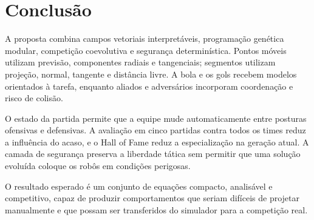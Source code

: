 \documentclass[12pt,a4paper]{article}
\begin{document}
\section{Conclus\~ao}

A proposta combina campos vetoriais interpret\'aveis, programa\c{c}\~ao gen\'etica modular, competi\c{c}\~ao coevolutiva e seguran\c{c}a determin\'istica. Pontos m\'oveis utilizam previs\~ao, componentes radiais e tangenciais; segmentos utilizam proje\c{c}\~ao, normal, tangente e dist\^ancia livre. A bola e os gols recebem modelos orientados \`a tarefa, enquanto aliados e advers\'arios incorporam coordena\c{c}\~ao e risco de colis\~ao.

O estado da partida permite que a equipe mude automaticamente entre posturas ofensivas e defensivas. A avalia\c{c}\~ao em cinco partidas contra todos os times reduz a influ\^encia do acaso, e o Hall of Fame reduz a especializa\c{c}\~ao na gera\c{c}\~ao atual. A camada de seguran\c{c}a preserva a liberdade t\'atica sem permitir que uma solu\c{c}\~ao evolu\'ida coloque os rob\^os em condi\c{c}\~oes perigosas.

O resultado esperado \'e um conjunto de equa\c{c}\~oes compacto, analis\'avel e competitivo, capaz de produzir comportamentos que seriam dif\'iceis de projetar manualmente e que possam ser transferidos do simulador para a competi\c{c}\~ao real.



\end{document}
